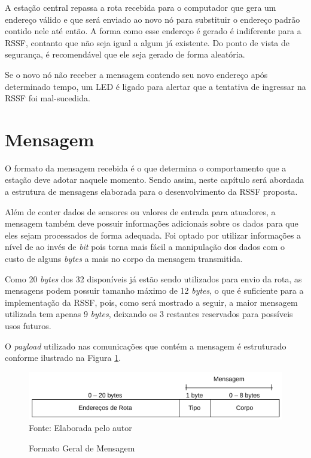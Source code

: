 {A estação central repassa a rota recebida para o computador que gera um endereço válido e que será enviado ao
novo nó para substituir o endereço padrão contido nele até então. A forma como esse endereço é gerado é
indiferente para a RSSF, contanto que não seja igual a algum já existente. Do ponto de vista de segurança, é
recomendável que ele seja gerado de forma aleatória.

Se o novo nó não receber a mensagem contendo seu novo endereço após determinado tempo, um LED é ligado para
alertar que a tentativa de ingressar na RSSF foi mal-sucedida.

\section{Mensagem}
O formato da mensagem recebida é o que determina o comportamento que a estação deve adotar naquele momento.
Sendo assim, neste capítulo será abordada a estrutura de mensagens elaborada para o desenvolvimento da RSSF
proposta.

Além de conter dados de sensores ou valores de entrada para atuadores, a mensagem também deve possuir
informações adicionais sobre os dados para que eles sejam processados de forma adequada. Foi optado por
utilizar informações a nível de  ao invés de \textit{bit} pois torna mais fácil a manipulação dos
dados com o custo de alguns \textit{bytes} a mais no corpo da mensagem transmitida.

Como 20 \textit{bytes} dos 32 disponíveis já estão sendo utilizados para envio da rota, as mensagens podem
possuir tamanho máximo de 12 \textit{bytes}, o que é suficiente para a implementação da RSSF, pois, como será
mostrado a seguir, a maior mensagem utilizada tem apenas 9 \textit{bytes}, deixando os 3 restantes reservados
para possíveis usos futuros.

O \textit{payload} utilizado nas comunicações que contém a mensagem é estruturado conforme ilustrado na Figura
\ref{figura:message_types}.

\begin{figure}[h!]
	\caption{Formato Geral de Mensagem}
	\centering
	\includegraphics[scale=0.5]{../images/mensagem_tipos.png}
	\hspace{\linewidth}
	Fonte: Elaborada pelo autor
	\label{figura:message_types}
\end{figure}

}
